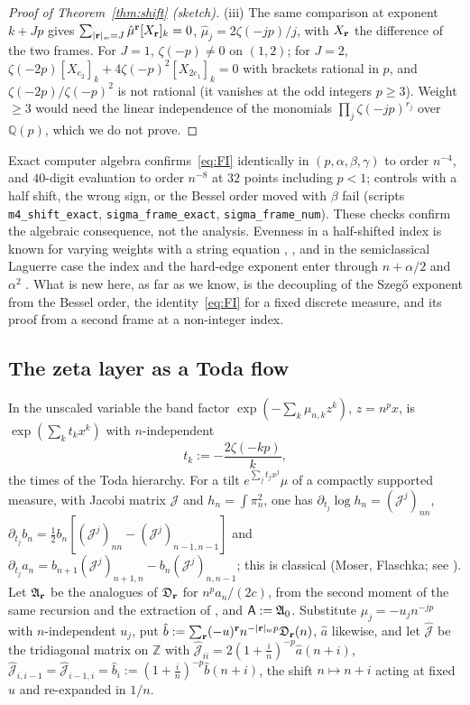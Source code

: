 \begin{proof}[Proof of Theorem~\ref{thm:shift} (sketch)]
(iii) The same comparison at exponent $k+Jp$ gives $\sum_{|\mathbf r|_w=J}\hat\mu^{\mathbf r}[X_{\mathbf r}]_k=0$, $\hat\mu_j=2\zeta(-jp)/j$, with $X_{\mathbf r}$ the
difference of the two frames. For $J=1$, $\zeta(-p)\ne0$ on $(1,2)$; for $J=2$, $\zeta(-2p)[X_{e_2}]_k+4\zeta(-p)^2[X_{2e_1}]_k=0$ with brackets
rational in $p$, and $\zeta(-2p)/\zeta(-p)^2$ is not rational (it vanishes at the odd integers $p\ge3$). Weight $\ge3$ would need the linear
independence of the monomials $\prod_j\zeta(-jp)^{r_j}$ over $\mathbb Q(p)$, which we do not prove.
\end{proof}

Exact computer algebra confirms~\eqref{eq:FI} identically in $(p,\alpha,\beta,\gamma)$ to order $n^{-4}$, and $40$-digit evaluation to order
$n^{-8}$ at $32$ points including $p<1$; controls with a half shift, the wrong sign, or the Bessel order moved with $\beta$ fail (scripts
\texttt{m4\_shift\_exact}, \texttt{sigma\_frame\_exact}, \texttt{sigma\_frame\_num}). These checks confirm the algebraic consequence, not the
analysis. Evenness in a half-shifted index is known for varying weights with a string equation \cite[Theorem~5.2]{BleherIts},
\cite{EMP,KuijlaarsTibboel}, and in the semiclassical Laguerre case the index and the hard-edge exponent enter through $n+\alpha/2$ and
$\alpha^2$ \cite[Theorem~2.1]{FilipukVanAsscheZhang}. What is new here, as far as we know, is the decoupling of the Szeg\H{o} exponent from the
Bessel order, the identity~\eqref{eq:FI} for a fixed discrete measure, and its proof from a second frame at a non-integer index.

\subsection{The zeta layer as a Toda flow}\label{sec:toda}
In the unscaled variable the band factor $\exp(-\sum_k\mu_{n,k}z^k)$, $z=n^px$, is $\exp(\sum_kt_kx^k)$ with $n$-independent
\begin{equation}\label{eq:todatimes}
  t_k:=-\frac{2\zeta(-kp)}k ,
\end{equation}
the times of the Toda hierarchy. For a tilt $e^{\sum_jt_jx^j}\mu$ of a compactly supported measure, with Jacobi matrix $\mathcal J$ and
$h_n=\int\pi_n^2$, one has $\partial_{t_j}\log h_n=(\mathcal J^j)_{nn}$, $\partial_{t_j}b_n=\frac12b_n[(\mathcal J^j)_{nn}-(\mathcal J^j)_{n-1,n-1}]$ and
$\partial_{t_j}a_n=b_{n+1}(\mathcal J^j)_{n+1,n}-b_n(\mathcal J^j)_{n,n-1}$; this is classical (Moser, Flaschka; see \cite[Lemma~2.1,
Theorem~2.4]{VanAsscheToda}). Let $\mathfrak A_{\mathbf r}$ be the analogues of $\mathfrak D_{\mathbf r}$ for $n^pa_n/(2c)$, from the second moment of the same recursion and
the extraction of \cite{PaperII}, and $\mathsf A:=\mathfrak A_0$. Substitute $\mu_j=-u_jn^{-jp}$ with $n$-independent $u_j$, put
$\hat b:=\sum_{\mathbf r}(-u)^{\mathbf r}n^{-|\mathbf r|_wp}\mathfrak D_{\mathbf r}(n)$, $\hat a$ likewise, and let $\hat{\mathcal J}$ be the tridiagonal matrix on $\mathbb Z$ with
$\hat{\mathcal J}_{ii}=2(1+\frac in)^{-p}\hat a(n+i)$, $\hat{\mathcal J}_{i,i-1}=\hat{\mathcal J}_{i-1,i}=\hat b_i:=(1+\frac in)^{-p}\hat b(n+i)$, the shift
$n\mapsto n+i$ acting at fixed $u$ and re-expanded in $1/n$.

